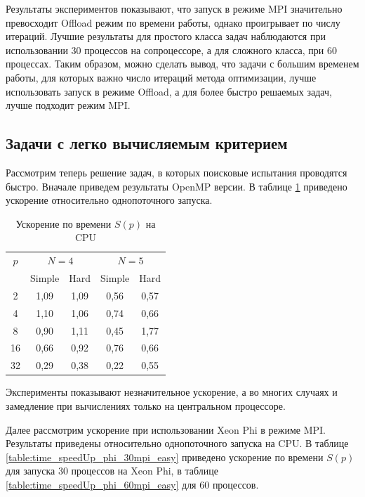 \documentclass[a4paper]{article}
\begin{document}
\par
Результаты экспериментов показывают, что запуск в режиме MPI значительно превосходит Offload режим по времени работы, однако проигрывает по числу итераций. Лучшие результаты для простого класса задач наблюдаются при использовании 30 процессов на сопроцессоре, а для сложного класса, при 60 процессах. Таким образом, можно сделать вывод, что задачи с большим временем работы, для которых важно число итераций метода оптимизации, лучше использовать запуск в режиме Offload, а для более быстро решаемых задач, лучше подходит режим MPI. 
\subsection{Задачи с легко вычисляемым критерием}
Рассмотрим теперь решение задач, в которых поисковые испытания проводятся быстро. Вначале приведем результаты OpenMP версии. В таблице \ref{table:time_speedUp_cpu_2} приведено ускорение относительно однопоточного запуска.
\begin{table}
    \centering
    \begin{tabular}{|c|c|c|c|c|}
    \hline
    \(p\) & \multicolumn{2}{|c|}{\(N=4\)} & \multicolumn{2}{|c|}{\(N=5\)}\\ \cline{2-5}
    & Simple & Hard & Simple & Hard \\ \hline
	2 & 1,09 & 1,09 & 0,56 & 0,57 \\ \hline
	4 & 1,10 & 1,06 & 0,74 & 0,66 \\ \hline
	8 & 0,90 & 1,11 & 0,45 & 1,77 \\ \hline
	16 & 0,66 & 0,92 & 0,76 & 0,66 \\ \hline
	32 & 0,29 & 0,38 & 0,22 & 0,55 \\ \hline
    \end{tabular}
    \caption{Ускорение по времени \(S(p)\) на CPU}
    \label{table:time_speedUp_cpu_2}
\end{table}
\par
Эксперименты показывают незначительное ускорение, а во многих случаях и замедление при вычислениях только на центральном процессоре.
\par
Далее рассмотрим ускорение при использовании Xeon Phi в режиме MPI. Результаты приведены относительно однопоточного запуска на CPU. В таблице \ref{table:time_speedUp_phi_30mpi_easy} приведено ускорение по времени \(S(p)\) для запуска 30 процессов на Xeon Phi, в таблице \ref{table:time_speedUp_phi_60mpi_easy} для 60 процессов.
\end{document}
